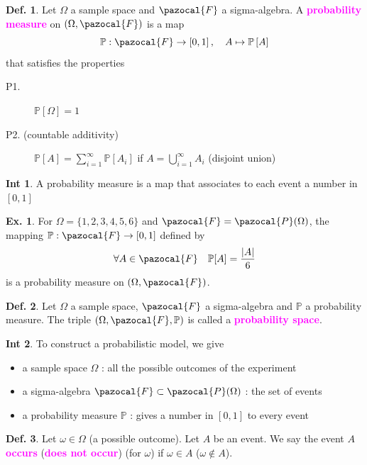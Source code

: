 \documentclass[8pt,a4paper,landscape]{article}
\theoremstyle{definition}
\newtheorem{definition}{Def.}[section]
\theoremstyle{example}
\newtheorem{example}{Ex.}[section]
\theoremstyle{intuition}
\newtheorem*{intuition}{Int}
\theoremstyle{definition}
\newcommand{\Fb}{\pazocal{F}}
\newcommand{\Pb}{\pazocal{P}}
\newcommand{\mydef}[1]{\textcolor{magenta}{\textbf{#1}}}
\DeclarePairedDelimiter\abs{\lvert}{\rvert}%
\begin{document}
\begin{multicols}{3}
				
				\begin{definition} \label{dpm}
					Let $\Omega$ a sample space and $\Fb$ a sigma-algebra. A \mydef{probability measure} on $(\Omega, \Fb)$ is a map
					$$
						\mathbb{P}: \Fb \to \left[0,1\right], \quad A \mapsto \mathbb{P}\left[A\right] 
					$$
					that satisfies the properties
					\begin{description} 
						\item[P1.] $\mathbb{P}[\Omega] = 1$
						\item[P2. (countable additivity)] $\mathbb{P}[A] = \sum_{i=1}^{\infty} \mathbb{P}[A_i]$ if $A = \bigcup_{i=1}^{\infty} A_i$ (disjoint union)
					\end{description}
				\end{definition}
				\begin{intuition}
					A probability measure is a map that associates to each event a number in $[0,1]$
				\end{intuition}
				\begin{example}
					For $\Omega = \{1,2,3,4,5,6\}$ and $\Fb = \Pb(\Omega)$, the mapping $\mathbb{P}: \Fb \to [0,1]$ defined by 
					$$
						\forall A \in \Fb \quad \mathbb{P}[A] = \frac{\abs{A}}{6}
					$$
					is a probability measure on $(\Omega, \Fb)$.
				\end{example}
				
				
				\begin{definition}
					Let $\Omega$ a sample space, $\Fb$ a sigma-algebra and $\mathbb{P}$ a probability measure. The triple $(\Omega, \Fb, \mathbb{P})$ is called a \mydef{probability space}.
				\end{definition}
				
				
				\begin{intuition}
					To construct a probabilistic model, we give
					\begin{itemize}
						\item a sample space $\Omega$ : all the possible outcomes of the experiment
						\item a sigma-algebra $\Fb \subset \Pb(\Omega)$ : the set of events
						\item a probability measure $\mathbb{P}$ : gives a number in $[0,1]$ to every event
					\end{itemize}
				\end{intuition}
				
				
				\begin{definition}
					Let $\omega \in \Omega$ (a possible outcome). Let $A$ be an event. We say the event $A$ \mydef{occurs} (\mydef{does not occur}) (for $\omega$) if $\omega \in A$ ($\omega \notin A$).
				\end{definition}
				

\end{multicols}
\end{document}
